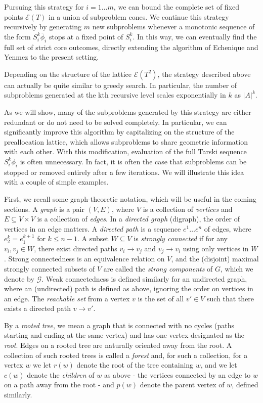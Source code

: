 \documentclass[11pt,reqno]{amsart}
\theoremstyle{definition}
\numberwithin{equation}{section}
\newcommand{\ol}{\overline}
\newcommand{\pre}{\phi}
\newcommand{\sub}{\subseteq}
\newcommand{\fix}{\mathcal{E}}
\newcommand{\toppre}{\ol{\pre}}
\newcommand{\strongc}{\mathcal{G}}
\begin{document}
Pursuing this strategy for $i = 1 \hdots m$, we can bound the complete set of fixed points $\fix(T)$ in a union of subproblem cones. 
We continue this strategy recursively by generating $m$ new subproblems whenever a monotonic sequence of the form $S_i^k \toppre_i $ stops at a fixed point of $S_i^k$. 
In this way, we can eventually find the full set of strict core outcomes, directly extending the algorithm of Echenique and Yenmez to the present setting.  

Depending on the structure of the lattice $\fix(T^2)$, the strategy described above can actually be quite similar to greedy search.  
In particular, the number of subproblems generated at the kth recursive level scales exponentially in $k$ as $|A|^k$.

As we will show, many of the subproblems generated by this strategy are either redundant or do not need to be solved completely.
In particular, we can significantly improve this algorithm by capitalizing on the structure of the preallocation lattice, which allows subproblems to share geometric information with each other. 
With this modification, evaluation of the full Tarski sequence $S_i^k \toppre_i$ is often unnecessary. 
In fact, it is often the case that subproblems can be stopped or removed entirely after a few iterations. 
We will illustrate this idea with a couple of simple examples.  

First, we recall some graph-theoretic notation, which will be useful in the coming sections. A \emph{graph} is a pair $(V,E)$, where $V$ is a collection of \emph{vertices} and $E \sub V \times V$ is a collection of \emph{edges}.
In a \emph{directed graph} (digraph), the order of vertices in an edge matters. 
A \emph{directed path} is a sequence $e^1 \hdots e^n$ of edges, where $e_2^k = e_1^{k+1}$ for $k \leq n-1$. 
A subset $W \sub V$ is \emph{strongly connected} if for any $v_i, v_j \in W$, there exist directed paths $v_i \to v_j$ and $v_j \to v_i$ using only vertices in $W$. 
Strong connectedness is an equivalence relation on $V$, and the (disjoint) maximal strongly connected subsets of $V$ are called the \emph{strong components} of $G$, which we denote by $\strongc$. 
Weak connectedness is defined similarly for an undirected graph, where an (undirected) path is defined as above, ignoring the order on vertices in an edge. 
The \emph{reachable set} from a vertex $v$ is the set of all $v' \in V$ such that there exists a directed path $v \to v'$. 

By a \emph{rooted tree}, we mean a graph that is connected with no cycles (paths starting and ending at the same vertex) and has one vertex designated as the \emph{root}. 
Edges on a rooted tree are naturally oriented away from the root. 
A collection of such rooted trees is called a \emph{forest} and, for such a collection, for a vertex $w$ we let $r(w)$ denote the root of the tree containing $w$, and we let $c(w)$ denote the \emph{children} of $w$ as above - the vertices connected by an edge to $w$ on a path away from the root - and $p(w)$ denote the parent vertex of $w$, defined similarly.  
\end{document}
